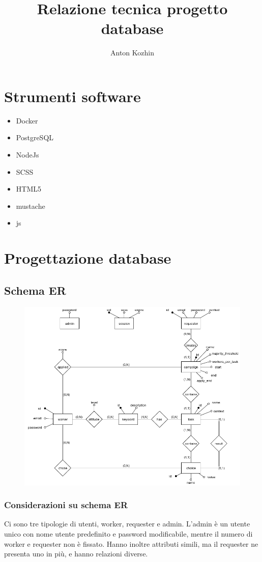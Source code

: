 \documentclass[a4paper]{article}
\title{Relazione tecnica progetto database}
\author{Anton Kozhin}
\begin{document}
\maketitle

\section{Strumenti software}
\begin{itemize}
\item Docker
\item PostgreSQL
\item NodeJs
\item SCSS
\item HTML5
\item mustache
\item js
\end{itemize}

\section{Progettazione database}
\subsection{Schema ER}

\begin{figure}[H]
\includegraphics[width=\textwidth]{ER.png}
\end{figure}

\subsubsection{Considerazioni su schema ER}
Ci sono tre tipologie di utenti, worker, requester e admin.
L'admin \`e un utente unico con nome utente predefinito e password modificabile, mentre il numero di worker e requester non \`e fissato. Hanno inoltre attributi simili, ma il requester ne presenta uno in pi\`u, e hanno relazioni diverse.
\end{document}
